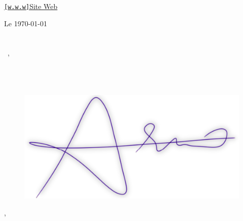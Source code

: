 \documentclass[16pt]{letter}
\begin{document}

\begin{center}
\large
\textcolor{lpkl}{
\href{http://arno.veletanlic.org}{{\small\texttt{[w.w.w]}}\enspace Site Web}\hfill
\href{mailto:\myemail}{\faEnvelope\enspace \myemail}\hfill
\href{tel:\myphone}{\faPhone\enspace \myphone}\hfill
\faMapMarker\enspace \href{https://goo.gl/maps/TG1BjiwrtCYisynV9}{\mylocation}
}
\end{center}
\vspace{2cm}

\textcolor{pp}{\Large Le \today}\\
\\\\
\textcolor{pp}{\large\greeting\ \recipient,}\\

\vspace{-0.1in}\setlength\parindent{24pt}
\noindent\\\\\\

\begin{figure}
    \vspace{-3cm}\includegraphics[width=0.3\paperwidth]{Signature-purple-thin.png}
\end{figure}
\begin{flushright}
\textcolor{pp}{\large\closer,}
\end{flushright}
\begin{flushright}
\textcolor{pp}{\large\myname}
\end{flushright}
\begin{flushright}
\textcolor{pp}{\mytitle}
\end{flushright}
\end{document}
